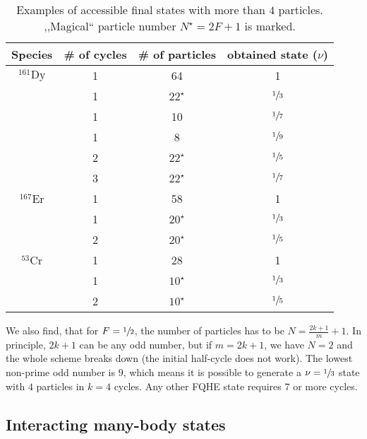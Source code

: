 \begin{table}[ht]
    \centering
    \begin{tabular}{ c c c c }
    \hline
    Species & \# of cycles & \# of particles & obtained state ($\nu$) \\
    \toprule
    $^{161}\text{Dy}$ & 1 & 64 & 1 \\
    & 1 & $22^\star$ & $\sfrac{1}{3}$ \\
    & 1 & 10 & $\sfrac{1}{7}$ \\
    & 1 & 8 & $\sfrac{1}{9}$ \\
    & 2 & $22^\star$ & $\sfrac{1}{5}$ \\
    & 3 & $22^\star$ & $\sfrac{1}{7}$ \\
    \midrule
    $^{167}\text{Er}$ & 1 & 58 & 1 \\
    & 1 & $20^\star$ & $\sfrac{1}{3}$ \\
    & 2 & $20^\star$ & $\sfrac{1}{5}$ \\
    \midrule
    $^{53}\text{Cr}$ & 1 & 28 & 1 \\
    & 1 & $10^\star$ & $\sfrac{1}{3}$ \\
    & 2 & $10^\star$ & $\sfrac{1}{5}$ \\
    \hline
    \end{tabular}
    \caption{Examples of accessible final states with more than $4$ particles. ,,Magical`` particle number $N^\star=2F+1$ is marked.}
\end{table}

We also find, that for $F=\sfrac{1}{2}$, the number of particles has to be $N=\frac{2k+1}{m}+1$. In principle, $2k+1$ can be any odd number, but if $m=2k+1$, we have $N=2$ and the whole scheme breaks down (the initial half-cycle does not work). The lowest non-prime odd number is $9$, which means it is possible to generate a $\nu=\sfrac{1}{3}$ state with $4$ particles in $k=4$ cycles. Any other FQHE state requires $7$ or more cycles.


\subsection{Interacting many-body states}
